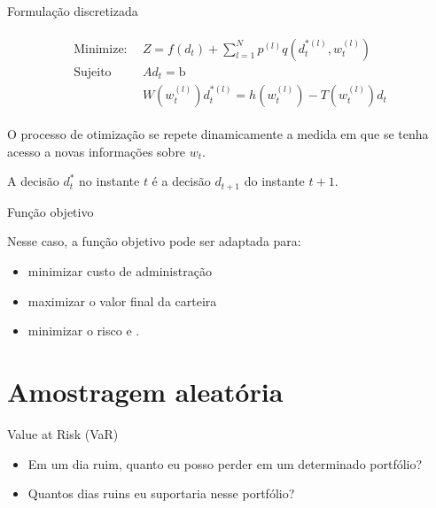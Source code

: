 \documentclass{beamer}
\begin{document}
\begin{frame}{Formulação discretizada}


\begin{equation}
\begin{array}{cc}
\left. \begin{aligned}
\text{Minimize:} \ \ &Z = f(d_t)  +\sum_{l=1}^N p^{(l)} q(d_t^{*(l)},w_t^{(l)}) \ \\
\text{Sujeito} \ \ & A d_t = \text{b} \\
& W(w_t^{(l)})d_t^{*(l)} = h(w_t^{(l)}) - T(w_t^{(l)})d_t
 \end{aligned}\right.
\end{array}
\label{eq:fobc}
\end{equation}



O processo de otimização se repete dinamicamente a medida em que se tenha acesso a novas informações sobre $w_t$. 

A decisão $d_t^{*}$ no instante $t$ é a decisão $d_{t+1}$ do instante $t+1$.

\end{frame}


\begin{frame}{Função objetivo}


Nesse caso, a função objetivo pode ser adaptada para:

\begin{itemize}
\item minimizar custo de administração \citep{Kouwenberg2008}
\item maximizar o valor final da carteira \citep{Johannes2014}
\item minimizar o risco \citep{Ferstl2011} e \citep{Quaranta2008}.
\end{itemize}

\end{frame}



\section{Amostragem aleatória}



\begin{frame}{Value at Risk (VaR)}

\begin{itemize}
\item Em um dia ruim, quanto eu posso perder em um determinado portfólio? 
\item Quantos dias ruins eu suportaria nesse portfólio?
\end{itemize}

\end{frame}
\end{document}
